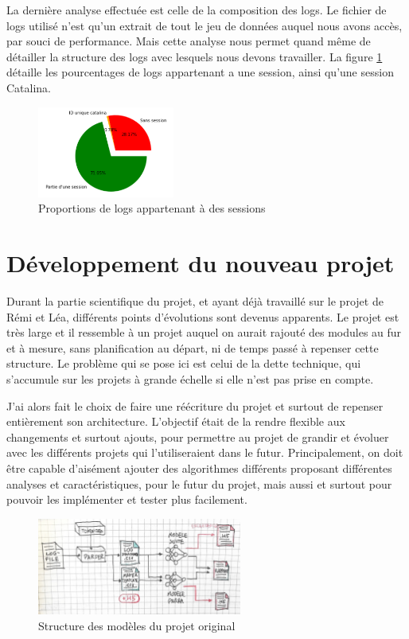 \documentclass[openany, 11pt]{memoir}
\begin{document}
La dernière analyse effectuée est celle de la composition des \glspl{log}. Le fichier de logs utilisé n'est qu'un extrait de tout le jeu de données auquel nous avons accès, par souci de performance. Mais cette analyse nous permet quand même de détailler la structure des logs avec lesquels nous devons travailler. La figure \ref{proportionsess} détaille les pourcentages de logs appartenant a une session, ainsi qu'une session Catalina.

\begin{figure}[ht]
	\centering
	\includegraphics[width=0.4\textwidth]{images/proportionsess.png}
	\caption{Proportions de logs appartenant à des sessions}
	\label{proportionsess}
\end{figure}

\section{Développement du nouveau projet}

Durant la partie scientifique du projet, et ayant déjà travaillé sur le projet de Rémi et Léa, différents points d'évolutions sont devenus apparents. Le projet est très large et il ressemble à un projet auquel on aurait rajouté des modules au fur et à mesure, sans planification au départ, ni de temps passé à repenser cette structure. Le problème qui se pose ici est celui de la dette technique, qui s'accumule sur les projets à grande échelle si elle n'est pas prise en compte.

J'ai alors fait le choix de faire une réécriture du projet et surtout de repenser entièrement son architecture. L'objectif était de la rendre flexible aux changements et surtout ajouts, pour permettre au projet de grandir et évoluer avec les différents projets qui l'utiliseraient dans le futur. Principalement, on doit être capable d'aisément ajouter des algorithmes différents proposant différentes analyses et caractéristiques, pour le futur du projet, mais aussi et surtout pour pouvoir les implémenter et tester plus facilement.

\begin{figure}[ht]
	\centering
	\includegraphics[width=0.6\textwidth]{images/analyselogs.jpg}
	\caption{Structure des modèles du projet original}
	\label{analyselogs}
\end{figure}
\end{document}
